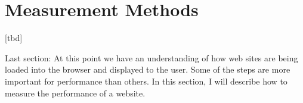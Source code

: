 	
















\section{Measurement Methods}


[tbd]



Last section: At this point we have an understanding of how web sites are being loaded into the browser and displayed to the user.
Some of the steps are more important for performance than others.
In this section, I will describe how to measure the performance of a website.


